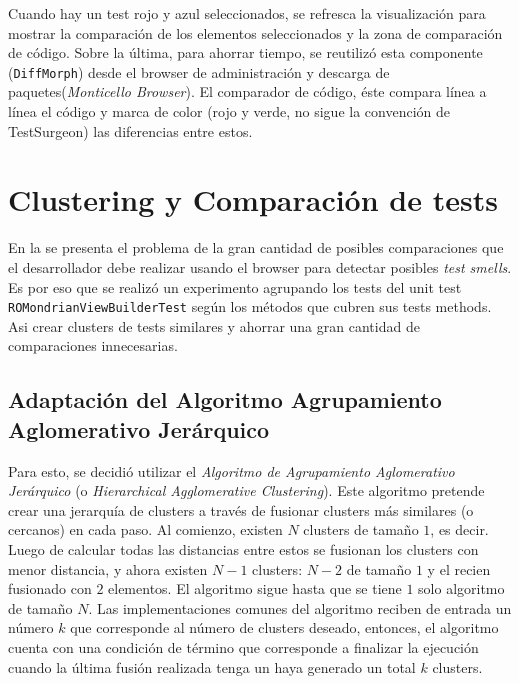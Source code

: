 \par Cuando hay un test rojo y azul seleccionados, se refresca la visualización para mostrar la comparación de los elementos seleccionados y la zona de comparación de código. Sobre la última, para ahorrar tiempo, se reutilizó esta componente ({\tt DiffMorph}) desde el browser de administración y descarga de paquetes(\emph{Monticello Browser}). El comparador de código, éste compara línea a línea el código y marca de color (rojo y verde, no sigue la convención de TestSurgeon) las diferencias entre estos. 
\section{Clustering y Comparación de tests}

\par En la  se presenta el problema de la gran cantidad de posibles comparaciones que el desarrollador debe realizar usando el browser para detectar posibles \emph{test smells}. Es por eso que se realizó un experimento agrupando los tests del unit test {\tt ROMondrianViewBuilderTest} según los métodos que cubren sus tests methods. Asi crear clusters de tests similares y ahorrar una gran cantidad de comparaciones innecesarias.

\subsection{Adaptación del Algoritmo Agrupamiento Aglomerativo Jerárquico}

\par Para esto, se decidió utilizar el \emph{Algoritmo de Agrupamiento Aglomerativo Jerárquico} (o \emph{Hierarchical Agglomerative Clustering}). Este algoritmo pretende crear una jerarquía de clusters a través de fusionar clusters más similares (o cercanos) en cada paso. Al comienzo, existen $N$ clusters de tamaño $1$, es decir. Luego de calcular todas las distancias entre estos se fusionan los clusters con menor distancia, y ahora existen $N-1$ clusters: $N-2$ de tamaño $1$ y el recien fusionado con $2$ elementos. El algoritmo sigue hasta que se tiene $1$ solo algoritmo de tamaño $N$. Las implementaciones comunes del algoritmo reciben de entrada un número $k$ que corresponde al número de clusters deseado, entonces, el algoritmo cuenta con una condición de término que corresponde a finalizar la ejecución cuando la última fusión realizada tenga un haya generado un total $k$ clusters.

